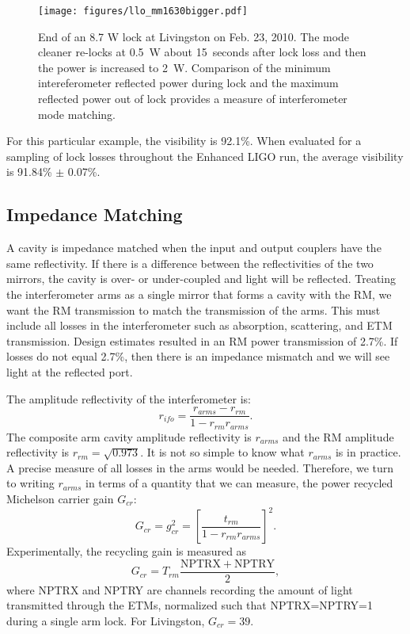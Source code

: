 \begin{figure}
\begin{centering}
\texttt{[image: figures/llo\_mm1630bigger.pdf]}
\caption[End of an 8.7 W lock at Livingston on Feb. 23, 2010]{End of
  an 8.7 W lock at Livingston on Feb. 23, 2010. The mode cleaner
  re-locks at 0.5~W about 15~seconds after lock loss and then the
  power is increased to 2~W. Comparison of the minimum intereferometer
  reflected power during lock and the maximum reflected power out of
  lock provides a measure of interferometer mode matching.}
\label{fig:llomm1630}
\end{centering}
\end{figure}

For this particular example, the visibility is 92.1\%.  When evaluated
for a sampling of lock losses throughout the Enhanced LIGO run, the
average visibility is 91.84\% $\pm$ 0.07\%.





\subsection{Impedance Matching}
\label{sec:impedance}
A cavity is impedance matched when the input and output couplers have
the same reflectivity. If there is a difference between the
reflectivities of the two mirrors, the cavity is over- or
under-coupled and light will be reflected. Treating the interferometer
arms as a single mirror that forms a cavity with the RM, we want the
RM transmission to match the transmission of the arms. This must
include all losses in the interferometer such as absorption,
scattering, and ETM transmission. Design estimates resulted in an RM
power transmission of 2.7\%. If losses do not equal 2.7\%, then there is an impedance mismatch and
we will see light at the reflected port. 

The amplitude reflectivity of the interferometer is:
\begin{equation} 
r_{ifo} = \frac{r_{arms}-r_{rm}}{1-r_{rm}r_{arms}}.
\end{equation}
The composite arm cavity amplitude reflectivity is $r_{arms}$ and the
RM amplitude reflectivity is $r_{rm} = \sqrt{0.973}$.  It is not so
simple to know what $r_{arms}$ is in practice. A precise measure of
all losses in the arms would be needed. Therefore, we turn to writing
$r_{arms}$ in terms of a quantity that we can measure, the power
recycled Michelson carrier gain $G_{cr}$:
\begin{equation}
G_{cr} = g_{cr}^2 = \left[\frac{t_{rm}}{1-r_{rm}r_{arms}}\right]^2.
\end{equation}
Experimentally, the recycling gain is measured as
\begin{equation}
G_{cr} = T_{rm} \frac{\mathrm{NPTRX + NPTRY}}{2},
\end{equation}
where NPTRX and NPTRY are channels recording the amount of light
transmitted through the ETMs, normalized such that NPTRX=NPTRY=1
during a single arm lock. For Livingston, $G_{cr} = 39$.

